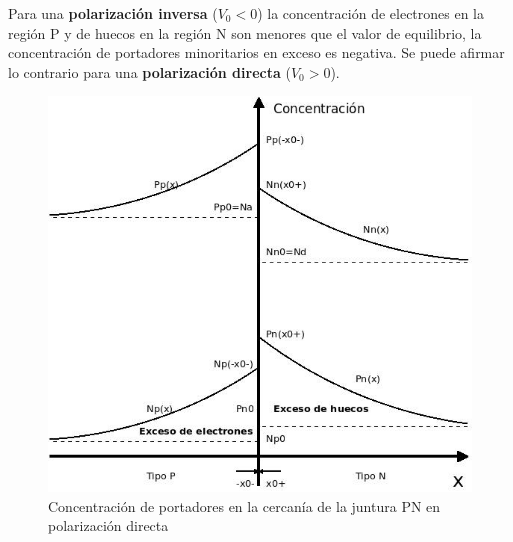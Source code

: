 \documentclass[oneside]{book}
\numberwithin{equation}{section}
\numberwithin{figure}{section}
\numberwithin{table}{section}
\begin{document}
		
				Para una \textbf{polarización inversa} ($V_0<0$) la concentración de electrones en la región P y de huecos en la región N son menores que el valor de equilibrio, la concentración de portadores minoritarios en exceso es negativa. Se puede afirmar lo contrario para una \textbf{polarización directa} ($V_0>0$).\\
				
				\begin{minipage}[t]{0.4\textwidth}
					\begin{figure}[H]
						\begin{center}
							\includegraphics[scale=0.35]{Concentracion-Directa.jpeg}
							\caption{Concentración de portadores en la cercanía de la juntura PN en polarización directa}
						\end{center}
					\end{figure}							
				\end{minipage}
\end{document}
